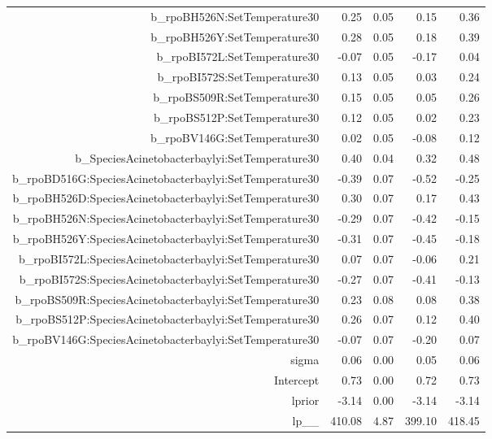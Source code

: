 \begin{table}[ht]
\begin{tabular}{rrrrr}
  b\_rpoBH526N:SetTemperature30 & 0.25 & 0.05 & 0.15 & 0.36 \\ 
  b\_rpoBH526Y:SetTemperature30 & 0.28 & 0.05 & 0.18 & 0.39 \\ 
  b\_rpoBI572L:SetTemperature30 & -0.07 & 0.05 & -0.17 & 0.04 \\ 
  b\_rpoBI572S:SetTemperature30 & 0.13 & 0.05 & 0.03 & 0.24 \\ 
  b\_rpoBS509R:SetTemperature30 & 0.15 & 0.05 & 0.05 & 0.26 \\ 
  b\_rpoBS512P:SetTemperature30 & 0.12 & 0.05 & 0.02 & 0.23 \\ 
  b\_rpoBV146G:SetTemperature30 & 0.02 & 0.05 & -0.08 & 0.12 \\ 
  b\_SpeciesAcinetobacterbaylyi:SetTemperature30 & 0.40 & 0.04 & 0.32 & 0.48 \\ 
  b\_rpoBD516G:SpeciesAcinetobacterbaylyi:SetTemperature30 & -0.39 & 0.07 & -0.52 & -0.25 \\ 
  b\_rpoBH526D:SpeciesAcinetobacterbaylyi:SetTemperature30 & 0.30 & 0.07 & 0.17 & 0.43 \\ 
  b\_rpoBH526N:SpeciesAcinetobacterbaylyi:SetTemperature30 & -0.29 & 0.07 & -0.42 & -0.15 \\ 
  b\_rpoBH526Y:SpeciesAcinetobacterbaylyi:SetTemperature30 & -0.31 & 0.07 & -0.45 & -0.18 \\ 
  b\_rpoBI572L:SpeciesAcinetobacterbaylyi:SetTemperature30 & 0.07 & 0.07 & -0.06 & 0.21 \\ 
  b\_rpoBI572S:SpeciesAcinetobacterbaylyi:SetTemperature30 & -0.27 & 0.07 & -0.41 & -0.13 \\ 
  b\_rpoBS509R:SpeciesAcinetobacterbaylyi:SetTemperature30 & 0.23 & 0.08 & 0.08 & 0.38 \\ 
  b\_rpoBS512P:SpeciesAcinetobacterbaylyi:SetTemperature30 & 0.26 & 0.07 & 0.12 & 0.40 \\ 
  b\_rpoBV146G:SpeciesAcinetobacterbaylyi:SetTemperature30 & -0.07 & 0.07 & -0.20 & 0.07 \\ 
  sigma & 0.06 & 0.00 & 0.05 & 0.06 \\ 
  Intercept & 0.73 & 0.00 & 0.72 & 0.73 \\ 
  lprior & -3.14 & 0.00 & -3.14 & -3.14 \\ 
  lp\_\_ & 410.08 & 4.87 & 399.10 & 418.45 \\ 
   \hline
\end{tabular}
\end{table}
